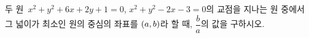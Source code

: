 두 원~$x^2+y^2+6x+2y+1=0$, $x^2+y^2-2x-3=0$의 교점을 지나는 원 중에서 그 넓이가 최소인 원의 중심의 좌표를 $(a{,}\mkern3mu\mathopen{}b)$라 할 때, $\dfrac{b}{a}$의 값을 구하시오.
